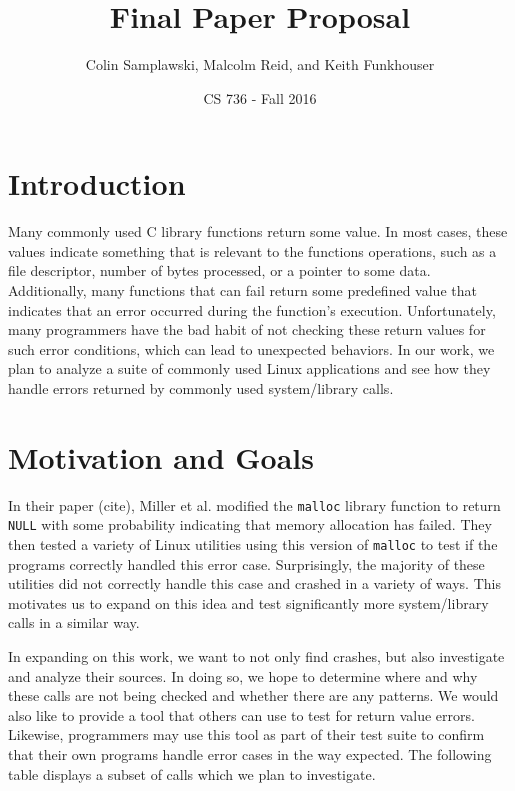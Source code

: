 \documentclass[10pt]{article}
\title{Final Paper Proposal}
\author{Colin Samplawski, Malcolm Reid, and Keith Funkhouser}
\date{CS 736 - Fall 2016}
\begin{document}
\maketitle
\setlength{\baselineskip}{18pt}
\section{Introduction}
Many commonly used C library functions return some value. In most cases, these values indicate something that is relevant to the  functions operations, such as a file descriptor, number of bytes processed, or a pointer to some data. Additionally, many functions that can fail return some predefined value that indicates that an error occurred during the function's execution. Unfortunately, many programmers have the bad habit of not checking these return values for such error conditions, which can lead to unexpected behaviors. In our work, we plan to analyze a suite of commonly used Linux applications and see how they handle errors returned by commonly used system/library calls.

\section{Motivation and Goals}
In their paper (cite), Miller et al. modified the \texttt{malloc} library function to return \texttt{NULL} with some probability indicating that memory allocation has failed. They then tested a variety of Linux utilities using this version of \texttt{malloc} to test if the programs correctly handled this error case. Surprisingly, the majority of these utilities did not correctly handle this case and crashed in a variety of ways. This motivates us to expand on this idea and test significantly more system/library calls in a similar way.

In expanding on this work, we want to not only find crashes, but also investigate and analyze their sources. In doing so, we hope to determine where and why these calls are not being checked and whether there are any patterns. We would also like to provide a tool that others can use to test for return value errors. Likewise, programmers may use this tool as part of their test suite to confirm that their own programs handle error cases in the way expected. The following table displays a subset of calls which we plan to investigate.
\end{document}
